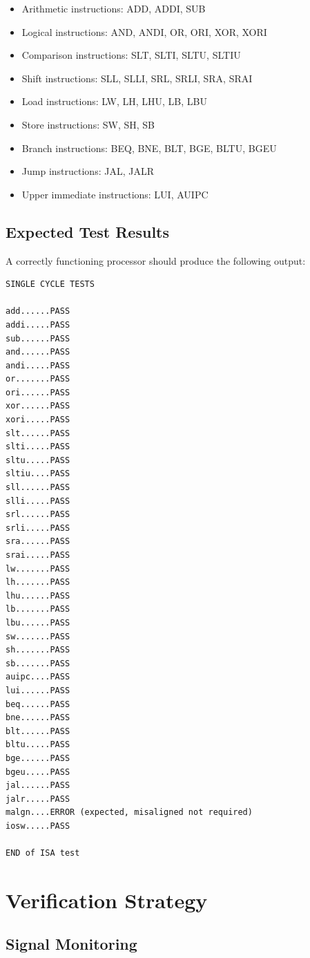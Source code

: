 \begin{itemize}
    \item Arithmetic instructions: ADD, ADDI, SUB
    \item Logical instructions: AND, ANDI, OR, ORI, XOR, XORI
    \item Comparison instructions: SLT, SLTI, SLTU, SLTIU
    \item Shift instructions: SLL, SLLI, SRL, SRLI, SRA, SRAI
    \item Load instructions: LW, LH, LHU, LB, LBU
    \item Store instructions: SW, SH, SB
    \item Branch instructions: BEQ, BNE, BLT, BGE, BLTU, BGEU
    \item Jump instructions: JAL, JALR
    \item Upper immediate instructions: LUI, AUIPC
\end{itemize}

\subsection{Expected Test Results}

A correctly functioning processor should produce the following output:

\begin{verbatim}
SINGLE CYCLE TESTS

add......PASS
addi.....PASS
sub......PASS
and......PASS
andi.....PASS
or.......PASS
ori......PASS
xor......PASS
xori.....PASS
slt......PASS
slti.....PASS
sltu.....PASS
sltiu....PASS
sll......PASS
slli.....PASS
srl......PASS
srli.....PASS
sra......PASS
srai.....PASS
lw.......PASS
lh.......PASS
lhu......PASS
lb.......PASS
lbu......PASS
sw.......PASS
sh.......PASS
sb.......PASS
auipc....PASS
lui......PASS
beq......PASS
bne......PASS
blt......PASS
bltu.....PASS
bge......PASS
bgeu.....PASS
jal......PASS
jalr.....PASS
malgn....ERROR (expected, misaligned not required)
iosw.....PASS

END of ISA test
\end{verbatim}

\section{Verification Strategy}

\subsection{Signal Monitoring}

